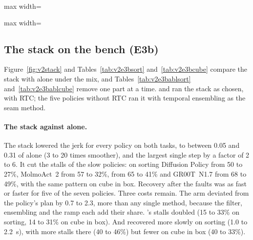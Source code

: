 \begin{table}[htbp]
  \centering
  \small
  \begin{adjustbox}{max width=\textwidth}
  \end{adjustbox}
  \caption{E3a on sorting: each smoothing method alone on \drtc{} under the fault mix (medians over 8 runs).}\label{tab:v2e3asort}
\end{table}

\begin{table}[htbp]
  \centering
  \small
  \begin{adjustbox}{max width=\textwidth}
  \end{adjustbox}
  \caption{E3a on cube in box v1, as Table~\ref{tab:v2e3asort}.}\label{tab:v2e3acube}
\end{table}

\subsection{The stack on the bench (E3b)}\label{sec:v2e3b}

Figure~\ref{fig:v2stack} and Tables~\ref{tab:v2e3bsort} and~\ref{tab:v2e3bcube} compare the stack with \drtc{} alone
under the mix, and
Tables~\ref{tab:v2e3bablsort} and~\ref{tab:v2e3bablcube} remove one part at a time. \smolvla{} and \groot{} ran the
stack as chosen, with RTC; the five policies without RTC ran it with temporal ensembling as the seam method.

\paragraph{The stack against \drtc{} alone.} The stack lowered the jerk for every policy on both tasks, to between
0.05 and 0.31 of \drtc{} alone (3 to 20 times smoother), and the largest single step by a factor of 2 to 6. It cut the
stalls of the slow policies: on sorting Diffusion Policy from 50 to 27\%, MolmoAct~2 from 57 to 32\%, \groot{} from 65
to 41\% and GR00T~N1.7 from 68 to 49\%, with the same pattern on cube in box. Recovery after the faults was as fast or
faster for five of the seven policies. Three costs remain. The arm deviated from the policy's plan by 0.7 to
2.3\degree, more than any single method, because the filter, ensembling and the ramp each add their share. \smolvla's
stalls doubled (15 to 33\% on sorting, 14 to 31\% on cube in box). And \pizerofive{} recovered more slowly on sorting
(1.0 to 2.2~s), with more stalls there (40 to 46\%) but fewer on cube in box (40 to 33\%).

